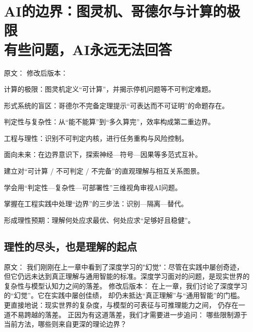 \chapter{AI的边界：图灵机、哥德尔与计算的极限 \texorpdfstring{\\}{ }有些问题，AI永远无法回答}

原文：
修改后版本：
\begin{introduction}[本章提要]
  \item 计算的极限：图灵机定义“可计算”，并揭示停机问题等不可判定难题。
  \item 形式系统的盲区：哥德尔不完备定理提示“可表达而不可证明”的命题存在。
  \item 判定性与复杂性：从“能不能算”到“多久算完”，效率构成第二重边界。
  \item 工程与理性：识别不可判定内核，进行任务重构与风险控制。
  \item 面向未来：在边界意识下，探索神经—符号—因果等多范式互补。
\end{introduction}

\begin{introduction}[你将收获]
  \item 建立对“可计算 / 不可判定 / 不完备”的直观理解与相互关系图景。
  \item 学会用“判定性—复杂性—可部署性”三维视角审视AI问题。
  \item 掌握在工程实践中处理“边界”的三步法：识别—隔离—替代。
  \item 形成理性预期：理解何处应求最优、何处应求“足够好且稳健”。
\end{introduction}

\section*{理性的尽头，也是理解的起点}

原文：
我们刚刚在上一章中看到了深度学习的"幻觉"：尽管在实践中屡创奇迹，但它仍远未达到真正理解与通用智能的标准。深度学习面对的问题，是现实世界的复杂性与模型认知力之间的落差。
修改后版本：
在上一章，我们讨论了深度学习的“幻觉”。它在实践中屡创佳绩，  
却仍未抵达“真正理解”与“通用智能”的门槛。  
更直接地说：现实世界的复杂度，与模型的可表征与可推理能力之间，  
仍存在一道不易跨越的落差。  
正因为有这道落差，我们才需要进一步追问：  
哪些限制源于当前方法，哪些则来自更深的理论边界？



